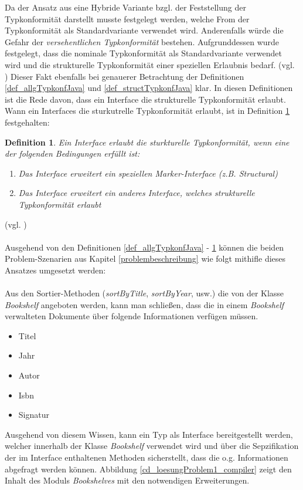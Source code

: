 \documentclass[11pt, 
ngerman,
doublespacing,
chapterinoneline, %
consistentlayout, %
]{scrartcl}
\newtheorem{definition}{Definition}
\begin{document}
Da der Ansatz aus \cite{structconfjava} eine Hybride Variante bzgl. der Feststellung der Typkonformität darstellt musste festgelegt werden, welche From der Typkonformität als Standardvariante verwendet wird. Anderenfalls würde die Gefahr der \emph{versehentlichen Typkonformität} be\-stehen. Aufgrunddessen wurde festgelegt, dass die nominale Typkonformität als Stand\-ardvariante verwendet wird und die strukturelle Typkonformität einer speziellen Erlaub\-nis bedarf. (vgl. \cite{structconfjava}) Dieser Fakt ebenfalls bei genauerer Betrachtung der Definitionen \ref{def_allgTypkonfJava} und \ref{def_structTypkonfJava} klar. In diesen Definitionen ist die Rede davon, dass ein Interface die strukturelle Typkonformität erlaubt. Wann ein Interfaces die sturkutrelle Typkonformität erlaubt, ist in Definition \ref{def_allowStruct} festgehalten: \begin{definition}\label{def_allowStruct}
Ein Interface erlaubt die sturkturelle Typkonformität, wenn eine der fol\-genden Bedingungen erfüllt ist:
\begin{enumerate}
\item Das Interface erweitert ein speziellen Marker-Interface (z.B. \emph{Structural})
\item Das Interface erweitert ein anderes Interface, welches strukturelle Typkonformität erlaubt
\end{enumerate} 
\end{definition} (vgl. \cite{structconfjava})\\\\
Ausgehend von den Definitionen \ref{def_allgTypkonfJava} - \ref{def_allowStruct} können die beiden Problem-Szenarien aus Kapitel \ref{problembeschreibung} wie folgt mithifle dieses Ansatzes umgesetzt werden:\\\\
Aus den Sortier-Methoden (\emph{sortByTitle}, \emph{sortByYear}, usw.) die von der Klasse \emph{Bookshelf} angeboten werden, kann man schließen, dass die in einem \emph{Bookshelf} verwalteten Dokumen\-te über folgende Informationen verfügen müssen.
\begin{itemize}
\item Titel
\item Jahr
\item Autor
\item Isbn
\item Signatur
\end{itemize}
Ausgehend von diesem Wissen, kann ein Typ als Interface bereitgestellt werden, welcher innerhalb der Klasse \emph{Bookshelf} verwendet wird und über die Sepzifikation der im Interface enthaltenen Methoden sicherstellt, dass die o.g. Informationen abgefragt werden können. Abbildung \ref{cd_loesungProblem1_compiler} zeigt den Inhalt des Moduls \emph{Bookshelves} mit den notwendigen Erweiterungen. 
\end{document}

